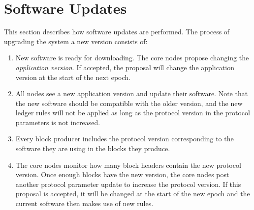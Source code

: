 \section{Software Updates}
\label{sec:software-updates}

This section describes how software updates are performed.
The process of upgrading the system a new version consists of:

\begin{enumerate}
  \item New software is ready for downloading. The core nodes propose changing the
    \textit{application version}. If accepted, the proposal
    will change the application version at the start of the next epoch.
  \item All nodes see a new application version and update their software.
    Note that the new software should be compatible with the older version, and the new
    ledger rules will not be applied as long as the protocol version in the
    protocol parameters is not increased.
  \item Every block producer includes the protocol version corresponding to the software
    they are using in the blocks they produce.
  \item The core nodes monitor how many block headers contain the new protocol version.
    Once enough blocks have the new version, the core nodes post another protocol parameter
    update to increase the protocol version.
    If this proposal is accepted, it will be changed at the start of the new epoch and
    the current software then makes use of new rules.
\end{enumerate}
